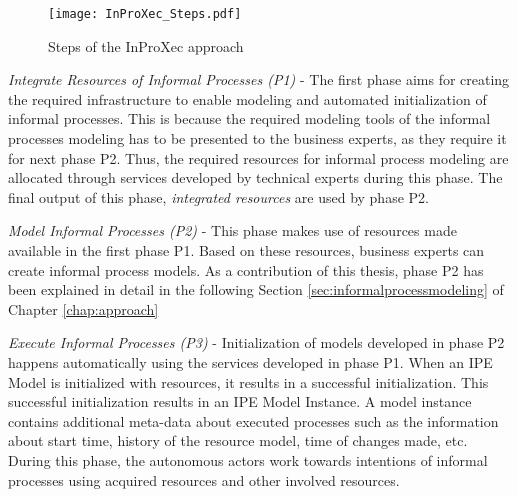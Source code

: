\begin{figure}
	\centering
	\texttt{[image: InProXec\_Steps.pdf]}
	\caption{Steps of the InProXec approach}
	\label{fig:inprocxec_steps}
\end{figure} 



\textit{Integrate Resources of Informal Processes (P1)} - The first phase aims for creating the required infrastructure to enable modeling and automated initialization of informal processes. This is because the required modeling tools of the informal processes modeling has to be presented to the business experts, as they require it for next phase P2. Thus, the required resources for informal process modeling are allocated through services developed by technical experts during this phase. The final output of this phase, \textit{integrated resources} are used by phase P2. 

\textit{Model Informal Processes (P2)} - This phase makes use of resources made available in the first phase P1. Based on these resources, business experts can create informal process models. As a contribution of this thesis, phase P2 has been explained in detail in the following Section \ref{sec:informalprocessmodeling} of Chapter \ref{chap:approach}

\textit{Execute Informal Processes (P3)} - Initialization of models developed in phase P2 happens automatically using the services developed in phase P1. When an IPE Model is initialized with resources, it results in a successful initialization. This successful initialization results in an IPE Model Instance. A model instance contains additional meta-data about executed processes such as the information about start time, history of the resource model, time of changes made, etc. During this phase, the autonomous actors work towards intentions of informal processes using acquired resources and other involved resources.  











